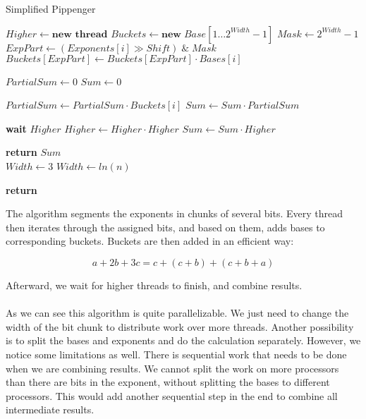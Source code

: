 \begin{algorithm}[h]
\caption{Simplified Pippenger}\label{fig:multiexp}
\begin{algorithmic}[1]

        \State $Higher \gets \textbf{new thread}$ 
    \EndIf
    \State $Buckets \gets \textbf{new} \; Base[1\dots2^{Width}-1]$
    \State $Mask \gets 2^{Width}-1$
        \State $ExpPart \gets (Exponents[i] \gg Shift) \; \&  \;Mask$
            \State $Buckets[ExpPart] \gets Buckets[ExpPart] \cdot Bases[i]$
        \EndIf
    \EndFor
    
    \State $PartialSum \gets 0$
    \State $Sum \gets 0$
    
        \State $PartialSum \gets PartialSum \cdot Buckets[i]$
        \State $Sum \gets Sum \cdot PartialSum$
    \EndFor
    
        \State \textbf{wait} $Higher$
            \State $Higher \gets Higher \cdot Higher$
        \EndFor
        \State $Sum \gets Sum \cdot Higher$ 
    \EndIf
    
    \State \textbf{return} $Sum$
\EndFunction
\\
        \State $Width \gets 3$
    \Else
        \State $Width \gets ln(n)$
    \EndIf

    \State \textbf{return} 
    
\EndFunction
\end{algorithmic}
\end{algorithm}

The algorithm segments the exponents in chunks of several bits. Every thread then iterates through the assigned bits, and based on them, adds bases to corresponding buckets. Buckets are then added in an efficient way:

$$ a + 2b + 3c = c + (c + b) + (c + b + a) $$

Afterward, we wait for higher threads to finish, and combine results.\\
\\
As we can see this algorithm is quite parallelizable. We just need to change the width of the bit chunk to distribute work over more threads. Another possibility is to split the bases and exponents and do the calculation separately. However, we notice some limitations as well. There is sequential work that needs to be done when we are combining results. We cannot split the work on more processors than there are bits in the exponent, without splitting the bases to different processors. This would add another sequential step in the end to combine all intermediate results.
\\
